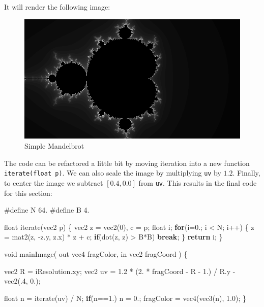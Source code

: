 \documentclass[11pt]{article}
\makeatletter
\def\maxwidth{\ifdim\Gin@nat@width>\linewidth\linewidth
    \else\Gin@nat@width\fi}
\let\Oldincludegraphics\includegraphics
\renewcommand{\includegraphics}[1]{\Oldincludegraphics[width=.8\maxwidth]{#1}}
\newenvironment{Shaded}{}{}
\newcommand{\KeywordTok}[1]{\textcolor[rgb]{0.00,0.44,0.13}{\textbf{{#1}}}}
\newcommand{\DataTypeTok}[1]{\textcolor[rgb]{0.56,0.13,0.00}{{#1}}}
\newcommand{\DecValTok}[1]{\textcolor[rgb]{0.25,0.63,0.44}{{#1}}}
\newcommand{\FloatTok}[1]{\textcolor[rgb]{0.25,0.63,0.44}{{#1}}}
\newcommand{\FunctionTok}[1]{\textcolor[rgb]{0.02,0.16,0.49}{{#1}}}
\newcommand{\NormalTok}[1]{{#1}}
\newcommand{\BuiltInTok}[1]{{#1}}
\newcommand{\PreprocessorTok}[1]{\textcolor[rgb]{0.74,0.48,0.00}{{#1}}}
\makeatother
\begin{document}
    It will render the following image:

    \begin{figure}[h]
\centering
\includegraphics{img/mandelbrot-first.png}
\caption{Simple Mandelbrot}
\end{figure}

    The code can be refactored a little bit by moving iteration into a new
function \texttt{iterate(float\ p)}. We can also scale the image by
multiplying \texttt{uv} by \(1.2\). Finally, to center the image we
subtract \([0.4, 0.0]\) from \texttt{uv}. This results in the final code
for this section:

    \begin{Shaded}
\begin{Highlighting}[]
\PreprocessorTok{#define N 64.}
\PreprocessorTok{#define B 4.}

\DataTypeTok{float} \FunctionTok{iterate}\NormalTok{(}\DataTypeTok{vec2}\NormalTok{ p) \{}
    \DataTypeTok{vec2}\NormalTok{ z = }\DataTypeTok{vec2}\NormalTok{(}\DecValTok{0}\NormalTok{), c = p;}
    \DataTypeTok{float}\NormalTok{ i;}
    \KeywordTok{for}\NormalTok{(i=}\FloatTok{0.}\NormalTok{; i < N; i++) \{}
\NormalTok{        z = }\DataTypeTok{mat2}\NormalTok{(z, -z.}\FunctionTok{y}\NormalTok{, z.}\FunctionTok{x}\NormalTok{) * z + c;}
        \KeywordTok{if}\NormalTok{(}\BuiltInTok{dot}\NormalTok{(z, z) > B*B) }\KeywordTok{break}\NormalTok{;}
\NormalTok{    \}}
    \KeywordTok{return}\NormalTok{ i;       }
\NormalTok{\}}

\DataTypeTok{void} \FunctionTok{mainImage}\NormalTok{( }\DataTypeTok{out} \DataTypeTok{vec4}\NormalTok{ fragColor, }\DataTypeTok{in} \DataTypeTok{vec2}\NormalTok{ fragCoord ) \{}
    
    \DataTypeTok{vec2}\NormalTok{ R = iResolution.}\FunctionTok{xy}\NormalTok{;}
    \DataTypeTok{vec2}\NormalTok{ uv = }\FloatTok{1.2}\NormalTok{ * (}\FloatTok{2.}\NormalTok{ * fragCoord - R - }\FloatTok{1.}\NormalTok{) / R.}\FunctionTok{y}\NormalTok{ - }\DataTypeTok{vec2}\NormalTok{(.}\FunctionTok{4}\NormalTok{, }\FloatTok{0.}\NormalTok{);}

    \DataTypeTok{float}\NormalTok{ n = }\FunctionTok{iterate}\NormalTok{(uv) / N;}
    \KeywordTok{if}\NormalTok{(n==}\FloatTok{1.}\NormalTok{) n = }\FloatTok{0.}\NormalTok{;}
\NormalTok{    fragColor = }\DataTypeTok{vec4}\NormalTok{(}\DataTypeTok{vec3}\NormalTok{(n), }\FloatTok{1.0}\NormalTok{);}
\NormalTok{\}}
\end{Highlighting}
\end{Shaded}
\end{document}
